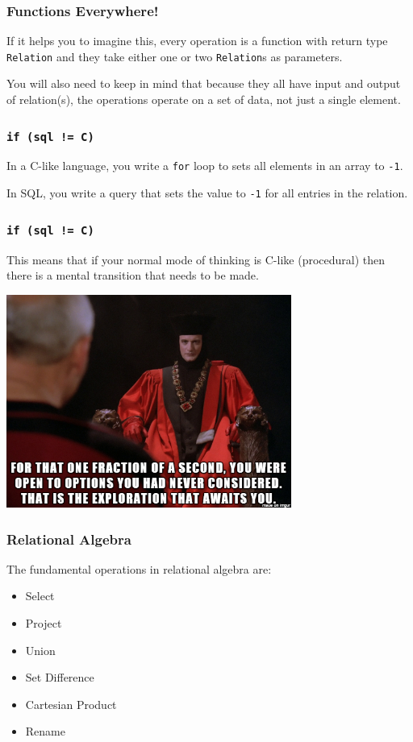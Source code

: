 \begin{frame}
\frametitle{Functions Everywhere!}

If it helps you to imagine this, every operation is a function with return type \texttt{Relation} and they take either one or two \texttt{Relation}s as parameters.

You will also need to keep in mind that because they all have input and output of relation(s), the operations operate on a set of data, not just a single element.


\end{frame}



\begin{frame}
\frametitle{\texttt{if (sql != C)} }

In a C-like language, you write a \texttt{for} loop to sets all elements in an array to \texttt{-1}. 

In SQL, you write a query that sets the value to \texttt{-1} for all entries in the relation. 

\end{frame}



\begin{frame}
\frametitle{\texttt{if (sql != C)} }

This means that if your normal mode of thinking is C-like (procedural) then there is a mental transition that needs to be made. 

\begin{center}
	\includegraphics[width=0.7\textwidth]{images/q-agt.png}
\end{center}

\end{frame}



\begin{frame}
\frametitle{Relational Algebra}


The fundamental operations in relational algebra are:
\begin{itemize}
	\item Select
	\item Project
	\item Union
	\item Set Difference
	\item Cartesian Product
	\item Rename
\end{itemize}

\end{frame}



